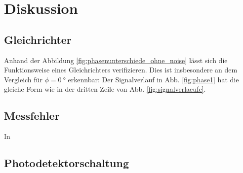 \section{Diskussion}
\subsection{Gleichrichter}
Anhand der Abbildung \ref{fig:phasenunterschiede_ohne_noise} lässt sich die Funktionsweise eines Gleichrichters verifizieren.
Dies ist insbesondere an dem Vergleich für $\phi = \qty[]{0}{\degree}$ erkennbar:
Der Signalverlauf in Abb. \ref{fig:phase1} hat die gleiche Form wie in der dritten Zeile von Abb. \ref{fig:signalverlaeufe}.



\subsection{Messfehler}
In \refname{}

\subsection{Photodetektorschaltung}
